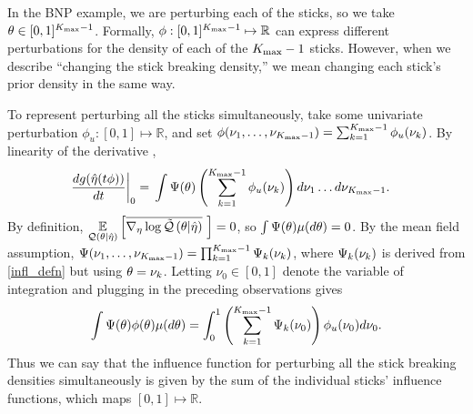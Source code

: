 



\begin{ex}
%
In the BNP example, we are perturbing each of the sticks, so we take $\theta \in
[0,1]^{{K_{\mathrm{max}}} - 1}$.  Formally, $\phi: [0,1]^{{K_{\mathrm{max}}} - 1} \mapsto \mathbb{R}$ can
express different perturbations for the density of each of the ${K_{\mathrm{max}}} - 1$
sticks.  However, when we describe ``changing the stick breaking density,'' we
mean changing each stick's prior density in the same way.

To represent perturbing all the sticks simultaneously, take some univariate
perturbation $\phi_{u}: [0,1] \mapsto \mathbb{R}$, and set $\phi(\nu_1, \ldots,
\nu_{{K_{\mathrm{max}}} - 1}) = \sum_{k=1}^{{K_{\mathrm{max}}} - 1} \phi_{u}(\nu_{k})$. By linearity of the
derivative ,
%
\begin{align*}
%
\fracat{d g(\etaopt(\t \phi))}{d \t}{0} ={}&
    \int \infl(\theta) \left(
        \sum_{\k=1}^{\kmax - 1} \phi_{u}(\nuk) \right)
    d\nu_1 \ldots d \nu_{\kmax - 1}.
%
\end{align*}
%
By definition, $\underset{\mathcal{Q}(\theta \vert \hat\eta)}{\mathbb{E}}\left[\overline{{\nabla_\eta \log \tilde{\mathcal{Q}}}\left(\theta \vert
\hat\eta\right)}\,\,\right] = 0$, so $\int \Psi(\theta) \mu(d\theta) = 0$.  By the mean field
assumption, $\Psi(\nu_1, \ldots, \nu_{{K_{\mathrm{max}}} - 1}) = \prod_{k=1}^{{K_{\mathrm{max}}} - 1}
\Psi_k(\nu_{k})$, where $\Psi_k(\nu_{k})$ is derived from \eqref{infl_defn} but
using $\theta = \nu_{k}$.  Letting $\nu_0 \in [0,1]$ denote the variable of
integration and plugging in the preceding observations gives
%
\begin{align*}
%
\int \infl(\theta) \phi(\theta) \mu(d\theta) =
    \int_0^1 \left(\sum_{\k=1}^{\kmax - 1} \infl_k(\nu_0) \right)
        \phi_{u}(\nu_0) d \nu_0.
%
\end{align*}
%
Thus we can say that the influence function for perturbing all the stick
breaking densities simultaneously is given by the sum of the
individual sticks' influence functions, which maps $[0,1] \mapsto \mathbb{R}$.
%
\end{ex}
